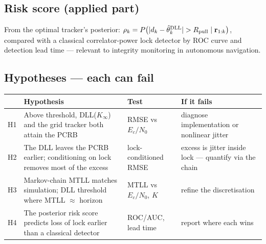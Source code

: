 \documentclass[11pt,a4paper]{article}
\newcommand{\br}{\mathbf{r}}
\begin{document}
\subsection{Risk score (applied part)}
From the optimal tracker's posterior:
$\rho_k=P\big(|d_k-\hat\theta^{\rm DLL}_k|>R_{\rm pull}\mid\br_{1:k}\big)$, compared with a classical correlator-power lock
detector by ROC curve and detection lead time --- relevant to integrity monitoring in autonomous navigation.

\subsection{Hypotheses --- each can fail}
\begin{center}
\begin{tabularx}{\textwidth}{l>{\raggedright\arraybackslash}X>{\raggedright\arraybackslash}p{3.0cm}>{\raggedright\arraybackslash}p{3.6cm}}
\toprule
 & \textbf{Hypothesis} & \textbf{Test} & \textbf{If it fails}\\
\midrule
H1 & Above threshold, DLL($K_\infty$) and the grid tracker both attain the PCRB & RMSE vs $E_c/N_0$ & diagnose implementation or nonlinear jitter\\
H2 & The DLL leaves the PCRB earlier; conditioning on lock removes most of the excess & lock-conditioned RMSE & excess is jitter inside lock --- quantify via the chain\\
H3 & Markov-chain MTLL matches simulation; DLL threshold where MTLL $\approx$ horizon & MTLL vs $E_c/N_0$, $K$ & refine the discretisation\\
H4 & The posterior risk score predicts loss of lock earlier than a classical detector & ROC/AUC, lead time & report where each wins\\
\bottomrule
\end{tabularx}
\end{center}
\end{document}
